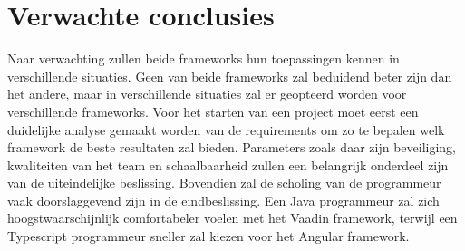 \section{Verwachte conclusies}
\label{sec:verwachte_conclusies}

Naar verwachting zullen beide frameworks hun toepassingen kennen in verschillende situaties. Geen van beide frameworks zal beduidend beter zijn dan het andere, maar in verschillende situaties zal er geopteerd worden voor verschillende frameworks. Voor het starten van een project moet eerst een duidelijke analyse gemaakt worden van de requirements om zo te bepalen welk framework de beste resultaten zal bieden. Parameters zoals daar zijn beveiliging, kwaliteiten van het team en schaalbaarheid zullen een belangrijk onderdeel zijn van de uiteindelijke beslissing. Bovendien zal de scholing van de programmeur vaak doorslaggevend zijn in de eindbeslissing. Een Java programmeur zal zich hoogstwaarschijnlijk comfortabeler voelen met het Vaadin framework, terwijl een Typescript programmeur sneller zal kiezen voor het Angular framework. 


